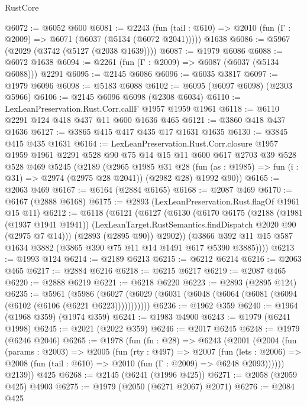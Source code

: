 \begin{lexlean}{RustCore}
\begin{coremodule}
@6072 := @6052 @600
@6081 := @2243
    (fun (tail : @610) => @2010 (fun (Γ : @2009) => @6071 (@6037 (@5134 (@6072 @2041)))))
    @1638
@6086 := @5967 (@2029 (@3742 (@5127 (@2038 @1639))))
@6087 := @1979 @6086
@6088 := @6072 @1638
@6094 := @2261 (fun (Γ : @2009) => @6087 (@6037 (@5134 @6088))) @2291
@6095 := @2145 @6086
@6096 := @6035 @3817
@6097 := @1979 @6096
@6098 := @5183 @6088
@6102 := @6095 (@6097 @6098) (@2303 @5966)
@6106 := @2145 @6096 @6098 (@2308 @6034)
@6110 := LexLeanPreservation.Rust.Corr.callF @1957 @1959 @1961
@6118 := @6110 @2291 @124 @418 @437 @11 @600 @1636 @465
@6121 := @3860 @418 @437 @1636
@6127 := @3865 @415 @417 @435 @17 @1631 @1635
@6130 := @3845 @415 @435 @1631
@6164 := LexLeanPreservation.Rust.Corr.closure
    @1957
    @1959
    @1961
    @2291
    @528
    @90
    @75
    @14
    @15
    @11
    @600
    @617
    @2703
    @39
    @528
    @528
    @469
    @5245
    (@2189
      (@2965
        @1985
        @31
        @28
        (fun (as : @1985) => fun (i : @31) => @2974 (@2975 @28 @2041))
        (@2982 @28)
        @1992
        @90))
@6165 := @2063 @469
@6167 := @6164 (@2884 @6165)
@6168 := @2087 @469
@6170 := @6167 (@2888 @6168)
@6175 := @2893 (LexLeanPreservation.Rust.flagOf @1961 @15 @11)
@6212 := @6118
    (@6121
      (@6127
        (@6130
          (@6170
            @6175
            (@2188
              (@1981 (@1937 @1941 @1941))
              (LexLeanTarget.RustSemantics.findDispatch @2020 @90 (@2975 @7 @14)))
            (@2893 (@2895 @90))
            @2902))
        (@3866 @392 @11 @15 @587 @1634 @3882 (@3865 @390 @75 @11 @14 @1491 @617 @5390 @3885))))
@6213 := @1993 @124
@6214 := @2189 @6213
@6215 := @6212 @6214
@6216 := @2063 @465
@6217 := @2884 @6216
@6218 := @6215 @6217
@6219 := @2087 @465
@6220 := @2888 @6219
@6221 := @6218 @6220
@6223 := @2893 (@2895 @124)
@6235 := @5961
    (@5986 (@6027 (@6029 (@6031 (@6048 (@6064 (@6081 (@6094 (@6102 (@6106 (@6221 @6223)))))))))))
@6236 := @1962 @359
@6240 := @1964 (@1968 @359) (@1974 @359)
@6241 := @1983 @4900
@6243 := @1979 (@6241 @1998)
@6245 := @2021 (@2022 @359)
@6246 := @2017 @6245
@6248 := @1979 (@6246 @2046)
@6265 := @1978
    (fun (fn : @28) =>
    @6243
      (@2001
        (@2004
          (fun (params : @2003) =>
          @2005
            (fun (rty : @497) =>
            @2007
              (fun (lets : @2006) =>
              @2008 (fun (tail : @610) => @2010 (fun (Γ : @2009) => @6248 @2093))))))
        @2139))
    @425
@6268 := @2145 (@6241 (@1996 @425))
@6271 := @2058 (@2059 @425) @4903
@6275 := @1979 (@2050 (@6271 @2067) @2071)
@6276 := @2084 @425

\end{coremodule}
\end{lexlean}
